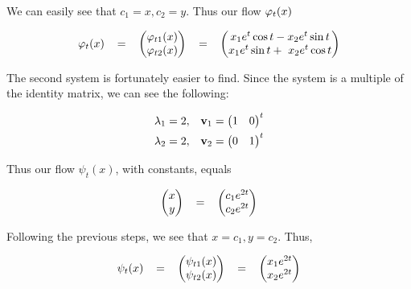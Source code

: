 \begin{solution}
    We can easily see that $c_1 = x, c_2 = y$. Thus our flow $\varphi_t(x)$

    \begin{align}
        \varphi_t(x)  \hspace{3mm} = \hspace{3mm} \begin{pmatrix} \varphi_{t1}(x) \\ \varphi_{t2}(x)\end{pmatrix} \hspace{3mm} = \hspace{3mm} 
        \begin{pmatrix}
            x_1e^t\cos t -  x_2e^t\sin t\\
            x_1e^t\sin t +\ x_2e^t\cos t
        \end{pmatrix}\label{p5.7: Aflow}
    \end{align}

    The second system is fortunately easier to find. Since the system is a multiple of the identity matrix, we can see the following:

        \begin{align}
        &\lambda_1 = 2, &\textbf{v}_1 = \begin{pmatrix}  1  &0\end{pmatrix}^t\nonumber\\
        &\lambda_2 = 2, &\textbf{v}_2 = \begin{pmatrix} 0 &1\end{pmatrix}^t\nonumber
    \end{align}

    Thus our flow $\psi_t(x)$, with constants, equals

    \begin{align}
        \begin{pmatrix} x \\ y\end{pmatrix} \hspace{3mm} = \hspace{3mm} 
        \begin{pmatrix}
            c_1e^{2t}\\
            c_2e^{2t}
        \end{pmatrix}\label{p5.7: general soln psi}
    \end{align}

    Following the previous steps, we see that $x = c_1, y = c_2$. Thus, 

        \begin{align}
        \psi_t(x)  \hspace{3mm} = \hspace{3mm} \begin{pmatrix} \psi_{t1}(x) \\ \psi_{t2}(x)\end{pmatrix} \hspace{3mm} = \hspace{3mm} 
        \begin{pmatrix}
            x_1e^{2t}\\
            x_2e^{2t}
        \end{pmatrix}\label{p5.7: Bflow}
    \end{align}


\end{solution}
